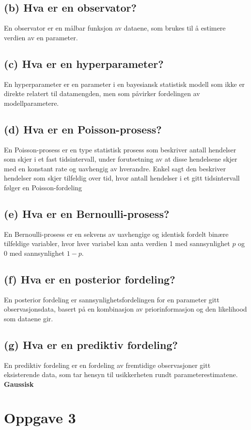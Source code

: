 \documentclass{article}
\begin{document}
\subsection*{(b) Hva er en observator?}
En observator er en målbar funksjon av dataene, som brukes til å estimere verdien av en parameter.

\subsection*{(c) Hva er en hyperparameter?}
En hyperparameter er en parameter i en bayesiansk statistisk modell som ikke er direkte relatert til datamengden, men som påvirker fordelingen av modellparametere.

\subsection*{(d) Hva er en Poisson-prosess?}
En Poisson-prosess er en type statistisk prosess som beskriver antall hendelser som skjer i et fast tidsintervall, under forutsetning av at disse hendelsene skjer med en konstant rate og uavhengig av hverandre. Enkel sagt den beskriver hendelser som skjer tilfeldig over tid, hvor antall hendelser i et gitt tidsintervall følger en Poisson-fordeling

\subsection*{(e) Hva er en Bernoulli-prosess?}
En Bernoulli-prosess er en sekvens av uavhengige og identisk fordelt binære tilfeldige variabler, hvor hver variabel kan anta verdien 1 med sannsynlighet \(p\) og 0 med sannsynlighet \(1-p\).

\subsection*{(f) Hva er en posterior fordeling?}
En posterior fordeling er sannsynlighetsfordelingen for en parameter gitt observasjonsdata, basert på en kombinasjon av priorinformasjon og den likelihood som dataene gir.

\subsection*{(g) Hva er en prediktiv fordeling?}
En prediktiv fordeling er en fordeling av fremtidige observasjoner gitt eksisterende data, som tar hensyn til usikkerheten rundt parameterestimatene.
\newpage
\bf{Gaussisk}
\section{Oppgave 3}
\end{document}

